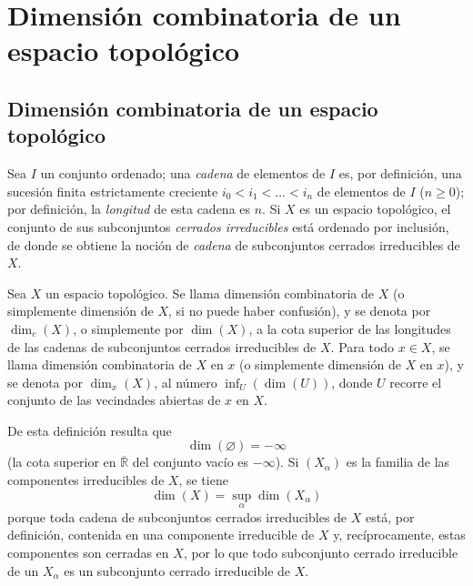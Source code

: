 
\setcounter{section}{13}
\section{Dimensión combinatoria de un espacio topológico}
\label{section:0.14-fr}

\setcounter{subsection}{0}
\subsection{Dimensión combinatoria de un espacio topológico}
\label{subsection:0.14.1-fr}

\begin{env}[14.1.1]
\label{0.14.1.1-fr}
Sea $I$ un conjunto ordenado; una \emph{cadena} de elementos de $I$ es, por
definición, una sucesión finita estrictamente creciente
$i_0<i_1<\ldots<i_n$ de elementos de $I$ ($n\geq 0$); por definición, la
\emph{longitud} de esta cadena es $n$. Si $X$ es un espacio topológico, el
conjunto de sus subconjuntos \emph{cerrados irreducibles} está ordenado por
inclusión, de donde se obtiene la noción de \emph{cadena} de subconjuntos
cerrados irreducibles de $X$.
\end{env}

\begin{definition}[14.1.2]
\label{0.14.1.2-fr}
Sea $X$ un espacio topológico. Se llama dimensión combinatoria de $X$
\textup{(o simplemente} dimensión de $X$, \textup{si no puede haber confusión)}, y se
denota por $\dim_c(X)$, o simplemente por $\dim(X)$, a la cota superior de las
longitudes de las cadenas de subconjuntos cerrados irreducibles de $X$. Para
todo $x\in X$, se llama dimensión combinatoria de $X$ en $x$ \textup{(o
simplemente} dimensión de $X$ en $x$), y se denota por $\dim_x(X)$, al
número $\inf_U(\dim(U))$, donde $U$ recorre el conjunto de las vecindades
abiertas de $x$ en $X$.
\end{definition}

De esta definición resulta que
\[
  \dim(\varnothing)=-\infty
\]
(la cota superior en $\overline{\mathbb R}$ del conjunto vacío es $-\infty$).
Si $(X_\alpha)$ es la familia de las componentes irreducibles de $X$, se tiene
\[
  \dim(X)=\sup_\alpha\dim(X_\alpha)
  \tag{14.1.2.1}\label{0.14.1.2.1-fr}
\]
porque toda cadena de subconjuntos cerrados irreducibles de $X$ está, por
definición, contenida en una componente irreducible de $X$ y, recíprocamente,
estas componentes son cerradas en $X$, por lo que todo subconjunto cerrado
irreducible de un $X_\alpha$ es un subconjunto cerrado irreducible de $X$.

